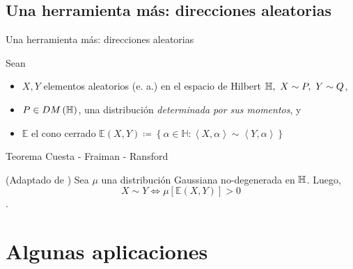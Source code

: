 \documentclass[10pt,spanish]{beamer}\usepackage[]{graphicx}\usepackage[]{color}
\begin{document}
\subsection{Una herramienta más: direcciones aleatorias}
\begin{frame}{Una herramienta más: direcciones aleatorias}

Sean
\begin{itemize}
\item $X,Y$ elementos aleatorios (e. a.) en el espacio de Hilbert $\mathbb{H},\ X\sim P,\ Y\sim Q$,
\end{itemize}

\pause{}
\begin{itemize}
\item $P\in DM\left(\mathbb{H}\right)$, una distribución \emph{determinada por
sus momentos}, y
\end{itemize}

\pause{}
\begin{itemize}
\item $\mathbb{E}$ el cono cerrado $\mathbb{E}\left(X,Y\right)\coloneqq\left\{ \alpha\in\mathbb{H}:\left\langle X,\alpha\right\rangle \sim\left\langle Y,\alpha\right\rangle \right\} $
\end{itemize}

\pause{}
\begin{exampleblock}{Teorema Cuesta - Fraiman - Ransford}

(Adaptado de \cite{Cuesta 2007}) Sea $\mu$ una distribución Gaussiana
no-degenerada en $\mathbb{H}$. Luego, 
\[
X\sim Y\iff\mu\left[\mathbb{E}\left(X,Y\right)\right]>0
\]
.
\end{exampleblock}
\end{frame}

\section[Aplicaciones]{Algunas aplicaciones}
\end{document}
